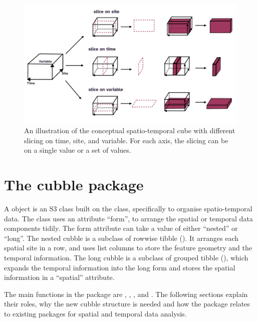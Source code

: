 \documentclass[
]{jss}
\begin{document}
\begin{CodeChunk}
\begin{figure}

{\centering \includegraphics[width=1\linewidth]{../figures/diagram-keynotes/diagram-keynotes.001} 

}

\caption[An illustration of the conceptual spatio-temporal cube with different slicing on time, site, and variable]{An illustration of the conceptual spatio-temporal cube with different slicing on time, site, and variable. For each axis, the slicing can be on a single value or a set of values.}\label{fig:cube-def}
\end{figure}
\end{CodeChunk}

\hypertarget{cubble}{%
\section{The cubble package}\label{cubble}}

A  object is an S3 class \citep{advr} built on the  class, specifically to organise spatio-temporal data. The  class uses an attribute ``form'', to arrange the spatial or temporal data components tidily. The form attribute can take a value of either ``nested'' or ``long''. The nested cubble is a subclass of rowwise tibble (). It arranges each spatial site in a row, and uses list columns to store the feature geometry and the temporal information. The long cubble is a subclass of grouped tibble (), which expands the temporal information into the long form and stores the spatial information in a ``spatial'' attribute.

The main functions in the package are , , , and . The following sections explain their roles, why the new cubble structure is needed and how the package relates to existing packages for spatial and temporal data analysis.
\end{document}
